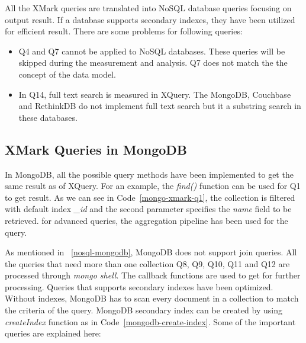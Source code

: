 All the XMark queries are translated into NoSQL database queries focusing  on output result. If a database supports secondary indexes, they have been utilized for efficient result. There are some problems for following queries:
\begin{itemize}
\item Q4 and Q7 cannot be applied to NoSQL databases. These queries will be skipped during the measurement and analysis. Q7 does not match the the concept of the data model. 
\item In Q14, full text search is measured in XQuery. The MongoDB, Couchbase and RethinkDB do not implement full text search but it a substring search in these databases. 
\end{itemize}

\subsection{XMark Queries in MongoDB}

In MongoDB, all the possible query methods have been implemented to get the same result as of XQuery.  For an example, the \textit{find()} function can be used for Q1 to get result. As we can see in  Code~\ref{mongo-xmark-q1}, the collection is filtered with default index \textit{\_id}  and the second parameter specifies the \textit{name} field to be retrieved.  for advanced queries, the aggregation pipeline has been used for the query. 

As mentioned in ~\ref{nosql-mongodb}, MongoDB does not support join queries. All the queries that need more than one collection  Q8, Q9, Q10, Q11 and Q12  are processed through \textit{mongo shell}. The callback functions are used  to get for further processing. Queries that supports secondary indexes have been optimized. Without indexes, MongoDB has to scan every document in a collection to match the criteria of the query. MongoDB secondary index can be created by using \textit{createIndex} function as in Code~\ref{mongodb-create-index}. Some of the important queries are explained here:

